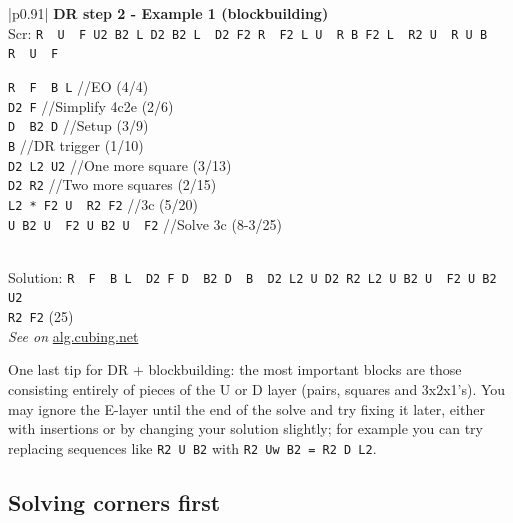 \documentclass[11pt,a4paper]{book}
\newcommand{\p}{\textquotesingle}
\newcommand{\m}{\texttt}
\newcommand{\ps}{\p\,\,}
\newcommand{\comment}[1]{{\color{gray}\quad//#1}}
\begin{document}
\bigskip
\begin{tabular}{|p{}|}
\hline
\textbf{DR step 2 - Example 1 (blockbuilding)}\\
\hline
Scr: \m{R\ps U\ps F  U2 B2 L  D2 B2 L\ps D2 F2 R\ps F2 L  U\ps R B  F2 L\ps R2 U\ps R  U  B R\ps U\ps F}\\
\hline
\begin{minipage}[l]{0.650\textwidth}
\m{R\ps F\ps B L\p} \comment{EO (4/4)}\\
\m{D2 F} \comment{Simplify 4c2e (2/6)}\\
\m{D\ps B2 D\p} \comment{Setup (3/9)}\\
\m{B\p} \comment{DR trigger (1/10)}\\
\m{D2 L2 U2} \comment{One more square (3/13)}\\
\m{D2 R2} \comment{Two more squares (2/15)}\\
\m{L2 * F2 U\ps R2 F2} \comment{3c (5/20)}\\
\m{U B2 U\ps F2 U B2 U\ps F2} \comment{Solve 3c (8-3/25)}
\end{minipage}
\begin{minipage}[c]{0.25\textwidth}

\end{minipage}\\
\hline
Solution: \m{R\ps F\ps B L\ps D2 F D\ps B2 D\ps B\ps D2 L2 U D2 R2 L2 U B2 U\ps F2 U B2 U2 }\\ \m{R2 F2} (25)\\
\hline
\emph{See on }\href{https://alg.cubing.net/?setup=R-_U-_F__U2_B2_L__D2_B2_L-_D2_F2_R-_F2_L__U-_R__B__F2_L-_R2_U-_R__U__B__R-_U-_F&alg=R-_F-_B_L-_\%2F\%2FEO_(4\%2F4)\%0AD2_F_\%2F\%2FSimplify_(2\%2F6)\%0AD-_B2_D-_B-_\%2F\%2FDR_(4\%2F10)\%0AD2_L2_U_\%2F\%2FOne_more_square_(3\%2F13)\%0AD2_R2_\%2F\%2FTwo_more_squares_(2\%2F15)\%0AL2_F2_U-_R2_F2_\%2F\%2F3c_(5\%2F25)}{alg.cubing.net}\\
\hline
\end{tabular}
\bigskip


One last tip for DR + blockbuilding: the most important blocks are those consisting entirely of pieces of the U or D layer (pairs, squares and 3x2x1's). You may ignore the E-layer until the end of the solve and try fixing it later, either with insertions or by changing your solution slightly; for example you can try replacing sequences like \m{R2 U B2} with \m{R2 Uw B2 = R2 D L2}. 

\subsection{Solving corners first}
\end{document}
